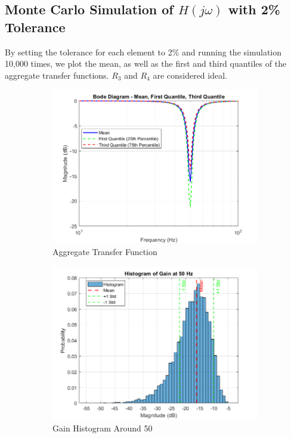 \documentclass[hidelinks,12pt]{article}
\begin{document}
	
	\subsection{Monte Carlo Simulation of \( H(j\omega) \) with 2\% Tolerance}
	By setting the tolerance for each element to 2\% and running the simulation 10,000 times, we plot the mean, as well as the first and third quantiles of the aggregate transfer functions. \( R_3 \) and \( R_4 \) are considered ideal.
	
	\begin{figure}[!h]
		\centering
		\begin{subfigure}[t]{0.48\textwidth}
			\centering
			\includegraphics[width=\textwidth]{figures/transfer_function_2_percent_tolerance_all.png}
			\caption{Aggregate Transfer Function}
		\end{subfigure}
		\hfill
		\begin{subfigure}[t]{0.48\textwidth}
			\centering
			\includegraphics[width=\textwidth]{figures/histogram_gain_50hz_2_percent_tolerance_all.png}
			\caption{Gain Histogram Around 50\,}
			\label{fig:histogram_gain_50hz}
		\end{subfigure}
		\caption{}
		\label{fig:2_percent_tolerance_all}
	\end{figure}
	
\end{document}
